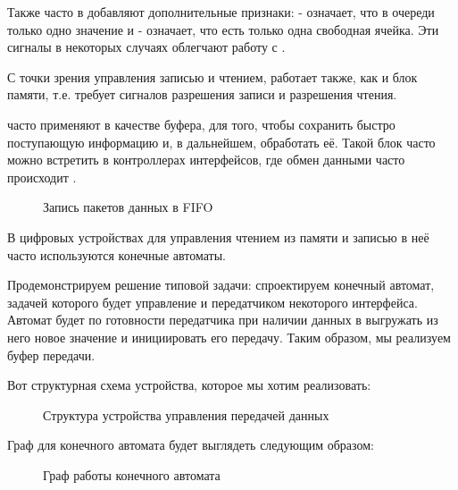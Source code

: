 \par{Также часто в  добавляют дополнительные признаки:  - означает, что в очереди только одно значение и  - означает, что есть только одна свободная ячейка. Эти сигналы в некоторых случаях облегчают работу с .}

\par{С точки зрения управления записью и чтением,  работает также, как и блок  памяти, т.е. требует сигналов разрешения записи и разрешения чтения.}

\vspace{4mm}

\par{ часто применяют в качестве буфера, для того, чтобы сохранить быстро поступающую информацию и, в дальнейшем, обработать её. Такой блок часто можно встретить в контроллерах интерфейсов, где обмен данными часто происходит .}

\begin{figure}[H]
	\centering
	\def\svgwidth{\columnwidth}
	
	\caption{Запись пакетов данных в FIFO}
\end{figure}

\par{В цифровых устройствах для управления чтением из памяти и записью в неё часто используются конечные автоматы.}

\par{Продемонстрируем решение типовой задачи: спроектируем конечный автомат, задачей которого будет управление  и передатчиком некоторого интерфейса. Автомат будет по готовности передатчика при наличии данных в  выгружать из него новое значение и инициировать его передачу. Таким образом, мы реализуем буфер передачи.}

\vspace{4mm}

\par{Вот структурная схема устройства, которое мы хотим реализовать:}

\begin{figure}[H]
	\centering
	\def\svgwidth{\columnwidth}
	
	\caption{Структура устройства управления передачей данных}
\end{figure}

\par{Граф для конечного автомата будет выглядеть следующим образом:}

\begin{figure}[H]
	\centering
	\def\svgwidth{\columnwidth}
	
	\caption{Граф работы конечного автомата}
\end{figure}

